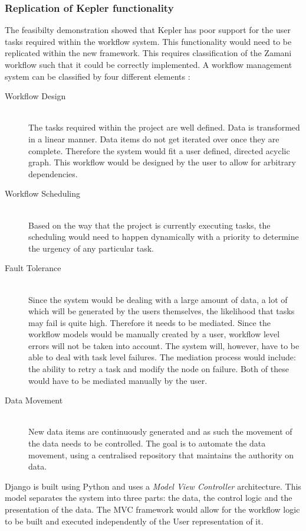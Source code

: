 \subsubsection{Replication of Kepler functionality}
The feasibilty demonstration showed that Kepler has poor support for the user
tasks required within the workflow system. This functionality would  need to
be replicated within the new framework. This requires classification
of the Zamani workflow such that it could be correctly implemented.
A workflow management system can be classified by four different elements
\cite{yu2005taxonomy}:
\begin{description}
    \item[Workflow Design] \hfill \\
        The tasks required within the project are well defined.
        Data is transformed in a linear manner. Data items do not get iterated over
        once they are complete. Therefore the system would fit a user defined,
        directed acyclic graph. This workflow would be designed by the user to
        allow for arbitrary dependencies.
    \item[Workflow Scheduling] \hfill \\
        Based on the way that the project is currently executing tasks, the scheduling
        would need to happen dynamically with a priority to determine the
        urgency of any particular task.
    \item[Fault Tolerance] \hfill \\
        Since the system would be dealing with a large amount of data, a lot of which
        will be generated by the users themselves, the likelihood that tasks may fail
        is quite high. Therefore it needs to be mediated. Since the workflow models
        would be manually created by a user, workflow level errors will not be taken
        into account. The system will, however, have to be able to deal with task level
        failures. The mediation process would include: the ability to retry a task
        and modify the node on failure. Both of these would have to be mediated manually
        by the user.
    \item[Data Movement] \hfill \\
        New data items are continuously generated and as such the movement of the data needs
        to be controlled. The goal is to automate the data movement, using a centralised
        repository that maintains the authority on data.
\end{description}
Django is built using Python and uses a \emph{Model View Controller}
architecture\cite{leff2001web}. This model separates the system into three parts: the
data, the control logic and the presentation of the data. The MVC framework would allow for
the workflow logic to be built and executed independently of the User representation of it.

